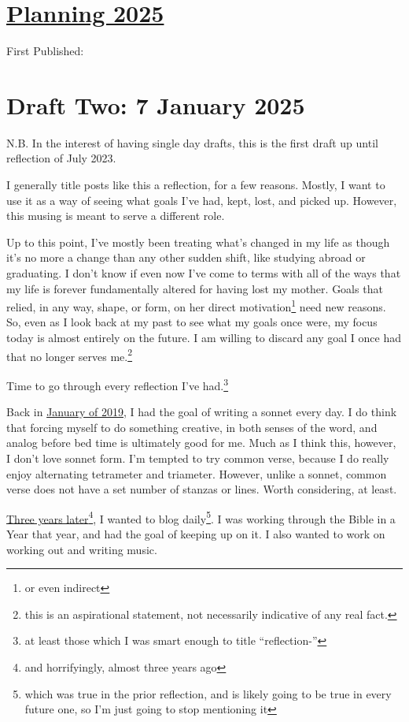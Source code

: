 \documentclass[12pt]{article}[titlepage]
\newcommand{\say}[1]{``#1''}
\renewcommand{\,}{\textsuperscript{,}}
\begin{document}
\doublespacing
\section{\href{planning-2025.html}{Planning 2025}}

First Published: 

\section{Draft Two: 7 January 2025}

N.B. In the interest of having single day drafts, this is the first draft up until reflection of July 2023.  


I generally title posts like this a reflection, for a few reasons.  
Mostly, I want to use it as a way of seeing what goals I've had, kept, lost, and picked up.  
However, this musing is meant to serve a different role.

Up to this point, I've mostly been treating what's changed in my life as though it's no more a change than any other sudden shift, like studying abroad or graduating.  
I don't know if even now I've come to terms with all of the ways that my life is forever fundamentally altered for having lost my mother.  
Goals that relied, in any way, shape, or form, on her direct motivation\footnote{or even indirect} need new reasons.  
So, even as I look back at my past to see what my goals once were, my focus today is almost entirely on the future.  
I am willing to discard any goal I once had that no longer serves me.\footnote{this is an aspirational statement, not necessarily indicative of any real fact.}

Time to go through every reflection I've had.\footnote{at least those which I was smart enough to title \say{reflection-}}

Back in \href{reflection-january-19}{January of 2019}, I had the goal of writing a sonnet every day.  
I do think that forcing myself to do something creative, in both senses of the word, and analog before bed time is ultimately good for me.  
Much as I think this, however, I don't love sonnet form.  
I'm tempted to try common verse, because I do really enjoy alternating tetrameter and triameter.  
However, unlike a sonnet, common verse does not have a set number of stanzas or lines.  
Worth considering, at least.

\href{reflection-january-22}{Three years later}\footnote{and horrifyingly, almost three years ago}, I wanted to blog daily\footnote{which was true in the prior reflection, and is likely going to be true in every future one, so I'm just going to stop mentioning it}.  
I was working through the Bible in a Year that year, and had the goal of keeping up on it.  
I also wanted to work on working out and writing music.
\end{document}
